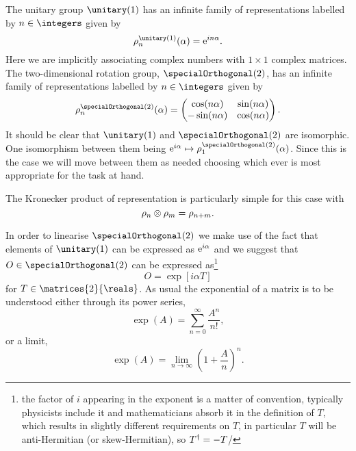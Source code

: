 The unitary group \(\unitary(1)\) has an infinite family of representations labelled by \(n \in \integers\) given by
\begin{equation}
    \rho_n^{\unitary(1)}(\alpha) = \e^{in\alpha}.
\end{equation}
Here we are implicitly associating complex numbers with \(1\times 1\) complex matrices.
The two-dimensional rotation group, \(\specialOrthogonal(2)\), has an infinite family of representations labelled by \(n \in \integers\) given by
\begin{equation}
    \rho_n^{\specialOrthogonal(2)}(\alpha) =
    \begin{pmatrix}
        \cos(n\alpha) & \sin(n\alpha)\\
        -\sin(n\alpha) & \cos(n\alpha)
    \end{pmatrix}
    .
\end{equation}
It should be clear that \(\unitary(1)\) and \(\specialOrthogonal(2)\) are isomorphic.
One isomorphism between them being \(\e^{i\alpha} \mapsto \rho_{1}^{\specialOrthogonal(2)}(\alpha)\).
Since this is the case we will move between them as needed choosing which ever is most appropriate for the task at hand.

The Kronecker product of representation is particularly simple for this case with
\begin{equation}
    \rho_{n} \otimes \rho_{m} = \rho_{n + m}.
\end{equation}

In order to linearise \(\specialOrthogonal(2)\) we make use of the fact that elements of \(\unitary(1)\) can be expressed as \(\mathrm{e}^{i\alpha}\) and we suggest that \(O \in \specialOrthogonal(2)\) can be expressed as\footnote{the factor of \(i\) appearing in the exponent is a matter of convention, typically physicists include it and mathematicians absorb it in the definition of \(T\), which results in slightly different requirements on \(T\), in particular \(T\) will be anti-Hermitian (or skew-Hermitian), so \(T^\dagger = -T\)/}
\begin{equation}
    O = \exp[i\alpha T]
\end{equation}
for \(T \in \matrices{2}{\reals}\).
As usual the exponential of a matrix is to be understood either  through its power series,
\begin{equation}
    \exp(A) = \sum_{n = 0}^{\infty} \frac{A^n}{n!},
\end{equation}
or a limit,
\begin{equation}
    \exp(A) = \lim_{n \to \infty} \left( 1 + \frac{A}{n} \right)^{n}.
\end{equation}

